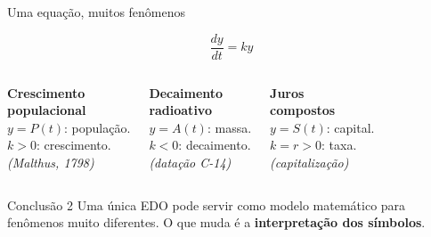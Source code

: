 \documentclass[12pt]{beamer}
\begin{document}
\begin{frame}{Uma equação, muitos fenômenos}

  \[
    \frac{dy}{dt} = ky
  \]

  \vspace{6pt}
  \begin{columns}[T]

      \textbf{Crescimento\\populacional}\\[4pt]
      $y = P(t)$: população.\\[4pt]
      $k > 0$: crescimento.\\[4pt]
      \textit{(Malthus, 1798)}

      \textbf{Decaimento\\radioativo}\\[4pt]
      $y = A(t)$: massa.\\[4pt]
      $k < 0$: decaimento.\\[4pt]
      \textit{(datação C-14)}

      \textbf{Juros\\compostos}\\[4pt]
      $y = S(t)$: capital.\\[4pt]
      $k = r > 0$: taxa.\\[4pt]
      \textit{(capitalização)}

  \end{columns}

  \vspace{14pt}
  \pause

  \begin{exampleblock}{Conclusão 2}
    Uma única EDO pode servir como modelo matemático
    para fenômenos muito diferentes.
    O que muda é a \textbf{interpretação dos símbolos}.
  \end{exampleblock}

\end{frame}

\end{document}
